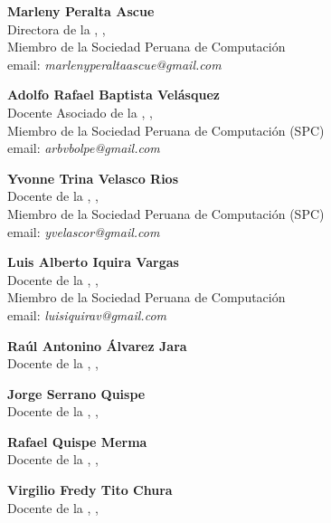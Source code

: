 \begin{center}
\textbf{Marleny Peralta Ascue}\\
Directora de la \SchoolShortName, \institution, \city\\
Miembro de la Sociedad Peruana de Computación\\
email: \textit{marlenyperaltaascue@gmail.com}
\end{center}

\begin{center}
\textbf{Adolfo Rafael Baptista Velásquez}\\
Docente Asociado de la \SchoolShortName, \institution, \city\\
Miembro de la Sociedad Peruana de Computación (SPC)\\
email: \textit{arbvbolpe@gmail.com}
\end{center}

\begin{center}
\textbf{Yvonne Trina Velasco Rios}\\
Docente de la \SchoolShortName, \institution, \city\\
Miembro de la Sociedad Peruana de Computación (SPC)\\
email: \textit{yvelascor@gmail.com}\\
\end{center}

\begin{center}
\textbf{Luis Alberto Iquira Vargas}\\
Docente de la \SchoolShortName, \institution, \city\\
Miembro de la Sociedad Peruana de Computación\\
email: \textit{luisiquirav@gmail.com}\\
\end{center}

\begin{center}
\textbf{Raúl Antonino Álvarez Jara}\\
Docente de la \SchoolShortName, \institution, \city\\
\end{center}

\begin{center}
\textbf{Jorge Serrano Quispe}\\
Docente de la \SchoolShortName, \institution, \city\\
\end{center}

\begin{center}
\textbf{Rafael Quispe Merma}\\
Docente de la \SchoolShortName, \institution, \city\\
\end{center}

\begin{center}
\textbf{Virgilio Fredy Tito Chura}\\
Docente de la \SchoolShortName, \institution, \city\\
\end{center}

